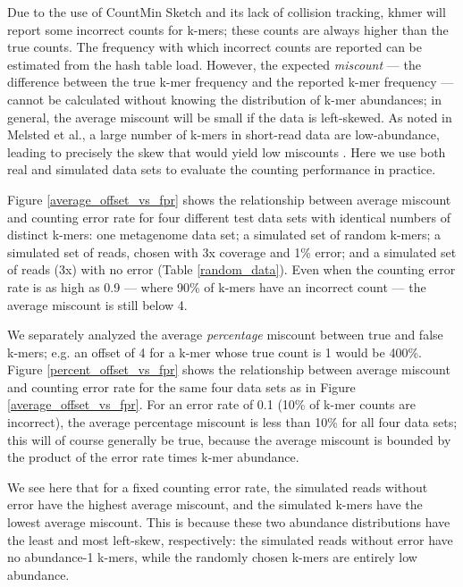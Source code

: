 \documentclass{article}
\begin{document}
Due to the use of CountMin Sketch and its lack of collision tracking,
khmer will report some incorrect counts for k-mers; these counts are
always higher than the true counts.  The frequency with which
incorrect counts are reported can be estimated from the hash table
load.  However, the expected {\em miscount} --- the difference
between the true k-mer frequency and the reported k-mer frequency --- cannot be
calculated without knowing the distribution of k-mer abundances; in
general, the average miscount will be small if the data is
left-skewed.  As noted in Melsted et al., a large number of k-mers in
short-read data are low-abundance, leading to precisely the skew
that would yield low miscounts \cite{Melsted2011}.  Here we use both
real and simulated data sets to evaluate the counting performance in
practice.

Figure \ref{average_offset_vs_fpr} shows the relationship between
average miscount and counting error rate for four different test data
sets with identical numbers of distinct k-mers: one metagenome data
set; a simulated set of random k-mers; a simulated set of reads,
chosen with 3x coverage and 1\% error; and a simulated set of reads (3x)
with no error (Table \ref{random_data}).  Even when the counting error rate is as high as 0.9 ---
where 90\% of k-mers have an incorrect count --- the average miscount is still
below 4.

We separately analyzed the average {\em percentage} miscount between
true and false k-mers; e.g. an offset of 4 for a k-mer whose true
count is 1 would be 400\%.  Figure \ref{percent_offset_vs_fpr} shows the relationship between average 
miscount and counting error rate for the same four data sets as in Figure \ref{average_offset_vs_fpr}.  For an error rate of 0.1 (10\% of k-mer counts are incorrect), the average percentage miscount is less than 10\% for all four data sets; this will of course generally be true, because the average miscount is bounded by the product of the error rate times k-mer abundance.

We see here that for a fixed counting error rate, the simulated reads
without error have the highest average miscount, and the simulated
k-mers have the lowest average miscount.  This is because these two
abundance distributions have the least and most left-skew,
respectively: the simulated reads without error have no abundance-1
k-mers, while the randomly chosen k-mers are entirely low abundance.
\end{document}
